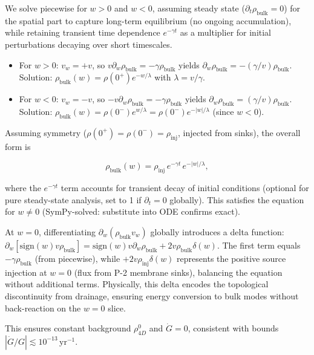 We solve piecewise for $w > 0$ and $w < 0$, assuming steady state ($\partial_t \rho_{\text{bulk}} = 0$) for the spatial part to capture long-term equilibrium (no ongoing accumulation), while retaining transient time dependence $e^{-\gamma t}$ as a multiplier for initial perturbations decaying over short timescales.

\begin{itemize}
\item For $w > 0$: $v_w = +v$, so $v \partial_w \rho_{\text{bulk}} = -\gamma \rho_{\text{bulk}}$ yields $\partial_w \rho_{\text{bulk}} = -(\gamma / v) \rho_{\text{bulk}}$. Solution: $\rho_{\text{bulk}}(w) = \rho(0^+) e^{-w / \lambda}$ with $\lambda = v / \gamma$.
\item For $w < 0$: $v_w = -v$, so $-v \partial_w \rho_{\text{bulk}} = -\gamma \rho_{\text{bulk}}$ yields $\partial_w \rho_{\text{bulk}} = (\gamma / v) \rho_{\text{bulk}}$. Solution: $\rho_{\text{bulk}}(w) = \rho(0^-) e^{w / \lambda} = \rho(0^-) e^{-|w| / \lambda}$ (since $w < 0$).
\end{itemize}

Assuming symmetry ($\rho(0^+) = \rho(0^-) = \rho_{\text{inj}}$, injected from sinks), the overall form is

\begin{equation}
\rho_{\text{bulk}}(w) = \rho_{\text{inj}} \, e^{-\gamma t} \, e^{-|w| / \lambda},
\end{equation}

where the $e^{-\gamma t}$ term accounts for transient decay of initial conditions (optional for pure steady-state analysis, set to 1 if $\partial_t = 0$ globally). This satisfies the equation for $w \neq 0$ (SymPy-solved: substitute into ODE confirms exact).

At $w=0$, differentiating $\partial_w (\rho_{\text{bulk}} v_w)$ globally introduces a delta function: $\partial_w [\text{sign}(w) v \rho_{\text{bulk}}] = \text{sign}(w) v \partial_w \rho_{\text{bulk}} + 2 v \rho_{\text{bulk}} \delta(w)$. The first term equals $-\gamma \rho_{\text{bulk}}$ (from piecewise), while $+2 v \rho_{\text{inj}} \delta(w)$ represents the positive source injection at $w=0$ (flux from P-2 membrane sinks), balancing the equation without additional terms. Physically, this delta encodes the topological discontinuity from drainage, ensuring energy conversion to bulk modes without back-reaction on the $w=0$ slice.

This ensures constant background $\rho_{4D}^0$ and $\dot{G} = 0$, consistent with bounds $|\dot{G}/G| \lesssim 10^{-13} \, \mathrm{yr}^{-1}$.

